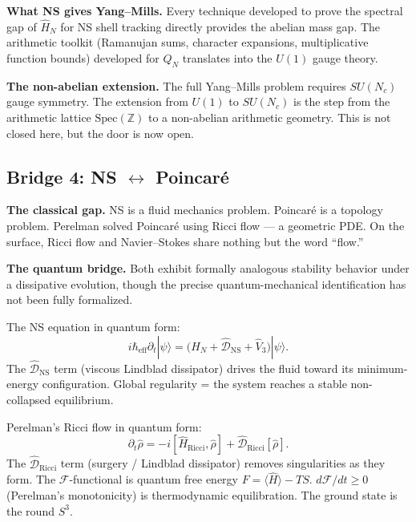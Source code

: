 \documentclass[12pt]{article}
\newcommand{\ket}[1]{|{#1}\rangle}
\begin{document}
\textbf{What NS gives Yang--Mills.}
Every technique developed to prove the spectral gap of $\hat{H}_N$
for NS shell tracking directly provides the abelian mass gap.
The arithmetic toolkit (Ramanujan sums, character expansions,
multiplicative function bounds) developed for $Q_N$
translates into the $U(1)$ gauge theory.

\textbf{The non-abelian extension.}
The full Yang--Mills problem requires $SU(N_c)$ gauge symmetry.
The extension from $U(1)$ to $SU(N_c)$ is the step from
the arithmetic lattice $\mathrm{Spec}(\mathbb{Z})$
to a non-abelian arithmetic geometry.
This is not closed here, but the door is now open.

\subsection{Bridge 4: NS $\longleftrightarrow$ Poincar\'{e}}
\label{sec:bridge-poincare}

\textbf{The classical gap.}
NS is a fluid mechanics problem.
Poincar\'{e} is a topology problem.
Perelman solved Poincar\'{e} using Ricci flow --- a geometric PDE.
On the surface, Ricci flow and Navier--Stokes share nothing but
the word ``flow.''

\textbf{The quantum bridge.}
Both exhibit formally analogous stability behavior under a dissipative evolution,
though the precise quantum-mechanical identification has not been fully formalized.

\medskip
The NS equation in quantum form:
\[
  i\hbar_{\mathrm{eff}}\partial_t\ket{\psi}
  = \bigl(\hat{H}_N + \hat{\mathcal{D}}_{\mathrm{NS}} + \hat{V}_3\bigr)\ket{\psi}.
\]
The $\hat{\mathcal{D}}_{\mathrm{NS}}$ term (viscous Lindblad dissipator)
drives the fluid toward its minimum-energy configuration.
Global regularity = the system reaches a stable non-collapsed equilibrium.

Perelman's Ricci flow in quantum form:
\[
  \partial_t\hat{\rho} = -i[\hat{H}_{\mathrm{Ricci}},\hat{\rho}]
  + \hat{\mathcal{D}}_{\mathrm{Ricci}}[\hat{\rho}].
\]
The $\hat{\mathcal{D}}_{\mathrm{Ricci}}$ term (surgery / Lindblad dissipator)
removes singularities as they form.
The $\mathcal{F}$-functional is quantum free energy $F = \langle\hat{H}\rangle - TS$.
$d\mathcal{F}/dt \ge 0$ (Perelman's monotonicity) is thermodynamic equilibration.
The ground state is the round $S^3$.
\end{document}
